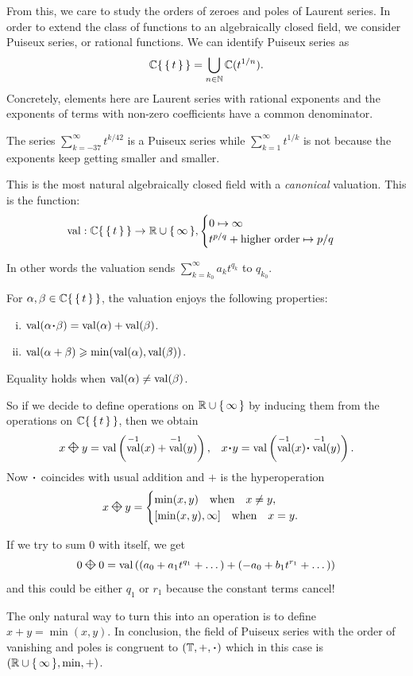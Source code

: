 \documentclass[12pt]{memoir}
\DeclareMathOperator{\val}{val}
\newcommand{\diamondplus}{\mathbin{\rotatebox[origin=c]{45}{$\boxtimes$}}} %
\theoremstyle{definition}
\def\al{\alpha}
\begin{document}
From this, we care to study the orders of zeroes and poles of Laurent series. In order to extend the class of functions to an algebraically closed field, we consider Puiseux series, or rational functions. We can identify Puiseux series as 
$$\mathbb{C}\{\,\{\,t\,\}\,\}=\bigcup_{n\in\mathbb{N}}\mathbb{C}(t^{1/n}).$$
Concretely, elements here are Laurent series with rational exponents and the exponents of terms with non-zero coefficients have a common denominator. 
\begin{Ex}
    The series $\sum_{k=-37}^{\infty}t^{k/42}$ is a Puiseux series while $\sum_{k=1}^\infty t^{1/k}$ is not because the exponents keep getting smaller and smaller.
\end{Ex}
This is the most natural algebraically closed field with a \emph{canonical} valuation. This is the function:
$$\val: \bC\set{\set{t}}\to\bR\cup\set{\infty},\begin{cases}
    0\mapsto\infty\\
    t^{p/q}+\text{higher order}\mapsto p/q
\end{cases}$$

In other words the valuation sends $\sum_{k=k_0}^\infty a_kt^{q_k}$ to $q_{k_0}$.
\begin{Prop}\label{prop:PropertiesOfValuation}
For $\al,\bt\in\bC\set{\set{t}}$, the valuation enjoys the following properties:
\begin{enumerate}[i.]
    \item $\val(\al\.\bt)=\val(\al)+\val(\bt)$.
    \item $\val(\al+\bt)\geq\min(\val(\al),\val(\bt))$.
\end{enumerate}
Equality holds when $\val(\al)\neq\val(\bt)$.
\end{Prop}
So if we decide to define operations on $\mathbb{R}\cup\{\,\infty\,\}$ by inducing them from the operations on $\mathbb{C}\{\,\{\,t\,\}\,\}$, then we obtain
\begin{align*}
    &x\diamondplus y=\val\left(\val^{-1}(x)+\val^{-1}(y)\right),
    &x\. y=\val\left(\val^{-1}(x)\.\val^{-1}(y)\right).
\end{align*}
Now $\.$ coincides with usual addition and $+$ is the hyperoperation
$$x\diamondplus y=\begin{cases}
    \min(x,y)\word{when}x\neq y,\\
    [\min(x,y),\infty]\word{when}x=y.
\end{cases}$$
\begin{Ex}
    If we try to sum $0$ with itself, we get 
    $$0\diamondplus 0=\val\left((a_0+a_1t^{q_1}+\dots)+(-a_0+b_1t^{r_1}+\dots)\right)$$
    and this could be either $q_1$ or $r_1$ because the constant terms cancel! 
\end{Ex}
The only natural way to turn this into an operation is to define $x+y=\min(x,y)$. In conclusion, the field of Puiseux series with the order of vanishing and poles is congruent to $(\bT,+,\.)$ which in this case is $\left(\mathbb{R}\cup\{\,\infty\,\},\min,+\right)$.
\end{document}
